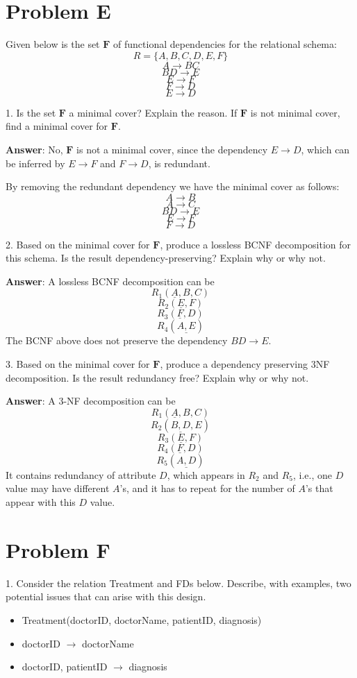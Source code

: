 \documentclass{article}
\begin{document}
\section{Problem E}
Given below is the set $\mathbf{F}$ of functional dependencies for the relational schema:
$$R = \{A, B, C, D, E, F\}$$
$$A \to BC$$
$$BD \to E$$
$$E \to F$$
$$F \to D$$
$$E \to D$$

1. Is the set $\mathbf{F}$ a minimal cover? Explain the reason. If $\mathbf{F}$ is not minimal cover, find a minimal cover for $\mathbf{F}$.

{\bf Answer}: No, $\mathbf{F}$ is not a minimal cover, since the dependency $E \to D$, which can be inferred by $E \to F$ and $F \to D$, is redundant.

By removing the redundant dependency we have the minimal cover as follows:
$$A \to B$$
$$A \to C$$
$$BD \to E$$
$$E \to F$$
$$F \to D$$

2. Based on the minimal cover for $\mathbf{F}$, produce a lossless BCNF decomposition for this schema. Is the result dependency-preserving? Explain why or why not.

{\bf Answer}: A lossless BCNF decomposition can be
$$R_1 (\underline{A}, B, C)$$
$$R_2 (\underline{E}, F)$$
$$R_3 (\underline{F}, D)$$
$$R_4 (\underline{A, E})$$
The BCNF above does not preserve the dependency $BD \to E$.

3. Based on the minimal cover for $\mathbf{F}$, produce a dependency preserving 3NF decomposition. Is the result redundancy free? Explain why or why not.

{\bf Answer}: A 3-NF decomposition can be
$$R_1 (\underline{A}, B, C)$$
$$R_2 (\underline{B, D}, E)$$
$$R_3 (\underline{E}, F)$$
$$R_4 (\underline{F}, D)$$
$$R_5 (\underline{A, D})$$
It contains redundancy of attribute $D$, which appears in $R_2$ and $R_5$, i.e., one $D$ value may have different $A$'s, and it has to repeat for the number of $A$'s that appear with this $D$ value. 

\section{Problem F}
1. Consider the relation Treatment and FDs below. Describe, with examples, two potential issues that can arise with this design.
\begin{itemize}
\item Treatment(doctorID, doctorName, patientID, diagnosis)
\item doctorID $\to$ doctorName
\item doctorID, patientID $\to$ diagnosis
\end{itemize}
\end{document}
